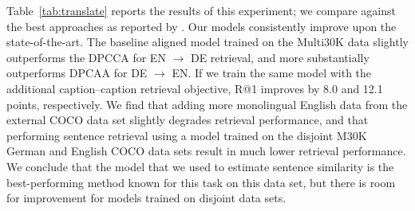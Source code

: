 Table~\ref{tab:translate} reports the results of this experiment; we compare against the best approaches as reported by \cite{rotman2018bridging}. Our models consistently improve upon the state-of-the-art. The baseline aligned model trained on the Multi30K data slightly outperforms the DPCCA for EN $\rightarrow$ DE retrieval, and more substantially outperforms DPCAA for DE $\rightarrow$ EN. If we train the same model with the additional caption--caption retrieval objective, R@1 improves by 8.0 and 12.1 points, respectively. We find that adding more monolingual English data from the external COCO data set slightly degrades retrieval performance, and that performing sentence retrieval using a model trained on the disjoint M30K German and English COCO data sets result in much lower retrieval performance. We conclude that the model that we used to estimate sentence similarity is the best-performing method known for this task on this data set, but there is room for improvement for models trained on disjoint data sets.

